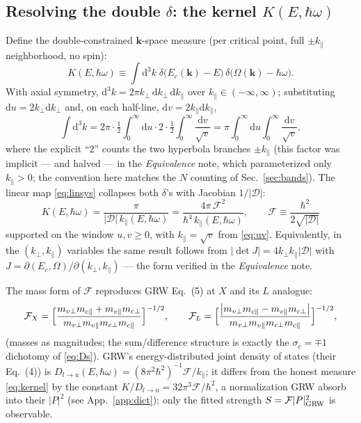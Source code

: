 \documentclass[11pt,a4paper]{article}
\numberwithin{equation}{section}
\newcommand{\hw}{\hbar\omega}
\newcommand{\cD}{\mathcal{D}}
\newcommand{\cF}{\mathcal{F}}
\newcommand{\kperp}{k_{\perp}}
\newcommand{\kpar}{k_{\parallel}}
\newcommand{\dd}{\mathrm{d}}
\newcommand{\Ec}{E_c}
\begin{document}
\subsection{Resolving the double $\delta$: the kernel $K(E,\hw)$}
\label{sec:kernel}

Define the double-constrained $\mathbf k$-space measure (per critical
point, full $\pm\kpar$ neighborhood, no spin):
\begin{equation}
K(E,\hw)\equiv\int\!\dd^3k\;
\delta\bigl(\Ec(\mathbf k)-E\bigr)\,
\delta\bigl(\Omega(\mathbf k)-\hw\bigr).
\end{equation}
With axial symmetry, $\dd^3k=2\pi\kperp\,\dd\kperp\,\dd\kpar$ over
$\kpar\in(-\infty,\infty)$; substituting
$\dd u=2\kperp\dd\kperp$ and, on each half-line,
$\dd v=2\kpar\dd\kpar$,
\begin{equation}
\int\!\dd^3k
=2\pi\cdot\tfrac12\int_0^\infty\!\!\dd u
 \cdot 2\cdot\tfrac12\int_0^\infty\!\frac{\dd v}{\sqrt v}
=\pi\int_0^\infty\!\!\dd u\int_0^\infty\!\frac{\dd v}{\sqrt v},
\end{equation}
where the explicit ``$2$'' counts the two hyperbola branches
$\pm\kpar$ (this factor was implicit --- and halved --- in the
\emph{Equivalence} note, which parameterized only $\kpar>0$; the
convention here matches the $N$ counting of Sec.~\ref{sec:bands}).
The linear map \eqref{eq:linsys} collapses both $\delta$'s with
Jacobian $1/|\cD|$:
\begin{equation}
\boxed{\;
K(E,\hw)=\frac{\pi}{|\cD|\,\kpar(E,\hw)}
=\frac{4\pi\,\cF^{2}}{\hbar^{4}\,\kpar(E,\hw)},
\qquad
\cF\equiv\frac{\hbar^{2}}{2\sqrt{|\cD|}}
\;}
\label{eq:kernel}
\end{equation}
supported on the window $u,v\ge0$, with $\kpar=\sqrt v$ from
\eqref{eq:uv}.  Equivalently, in the $(\kperp,\kpar)$ variables the
same result follows from
$|\det J|=4\kperp\kpar|\cD|$ with
$J=\partial(\Ec,\Omega)/\partial(\kperp,\kpar)$
--- the form verified in the \emph{Equivalence} note.

The mass form of $\cF$ reproduces GRW Eq.~(5) at $X$ and its
$L$ analogue:
\begin{equation}
\cF_X=\Bigl[\frac{m_{v\perp}m_{c\parallel}+m_{v\parallel}m_{c\perp}}
{m_{v\perp}m_{v\parallel}m_{c\perp}m_{c\parallel}}\Bigr]^{-1/2},
\qquad
\cF_L=\Bigl[\frac{\bigl|m_{v\perp}m_{c\parallel}-m_{v\parallel}m_{c\perp}\bigr|}
{m_{v\perp}m_{v\parallel}m_{c\perp}m_{c\parallel}}\Bigr]^{-1/2},
\label{eq:Fmass}
\end{equation}
(masses as magnitudes; the sum/difference structure is exactly the
$\sigma_c=\mp1$ dichotomy of \eqref{eq:Ds}).  GRW's energy-distributed
joint density of states (their Eq.~(4)) is
$D_{l\to u}(E,\hw)=(8\pi^2\hbar^2)^{-1}\cF/\kpar$; it differs from the
honest measure \eqref{eq:kernel} by the constant
$K/D_{l\to u}=32\pi^3\cF/\hbar^2$, a normalization GRW absorb into
their $|P|^2$ (see App.~\ref{app:dict}); only the fitted strength
$S=\cF|P|^2_{\rm GRW}$ is observable.
\end{document}
